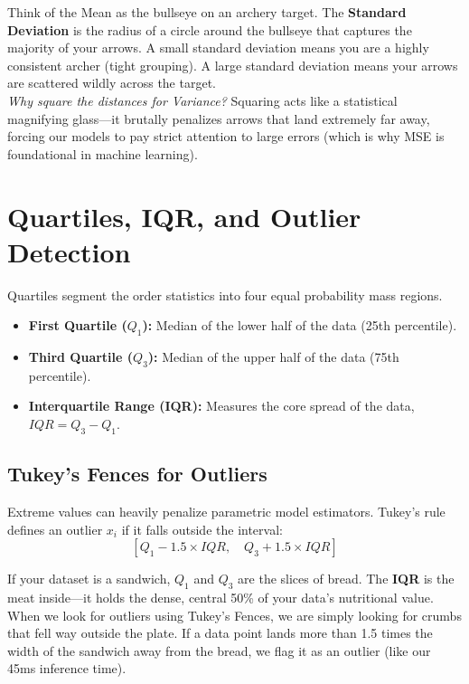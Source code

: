 \documentclass[11pt, a4paper]{article}
\begin{document}
\begin{tcolorbox}[profbox, title=Imagine: The Archer's Target]
Think of the Mean as the bullseye on an archery target. The \textbf{Standard Deviation} is the radius of a circle around the bullseye that captures the majority of your arrows. A small standard deviation means you are a highly consistent archer (tight grouping). A large standard deviation means your arrows are scattered wildly across the target. \\
\textit{Why square the distances for Variance?} Squaring acts like a statistical magnifying glass—it brutally penalizes arrows that land extremely far away, forcing our models to pay strict attention to large errors (which is why MSE is foundational in machine learning).
\end{tcolorbox}

\section{Quartiles, IQR, and Outlier Detection}
Quartiles segment the order statistics into four equal probability mass regions.

\begin{itemize}
    \item \textbf{First Quartile ($Q_1$):} Median of the lower half of the data (25th percentile). 
    \item \textbf{Third Quartile ($Q_3$):} Median of the upper half of the data (75th percentile).
    \item \textbf{Interquartile Range (IQR):} Measures the core spread of the data, $IQR = Q_3 - Q_1$.
\end{itemize}

\subsection*{Tukey's Fences for Outliers}
Extreme values can heavily penalize parametric model estimators. Tukey's rule defines an outlier $x_i$ if it falls outside the interval:
\[ \left[ Q_1 - 1.5 \times IQR, \quad Q_3 + 1.5 \times IQR \right] \]

\begin{tcolorbox}[profbox, title=Imagine: The Statistical Sandwich]
If your dataset is a sandwich, $Q_1$ and $Q_3$ are the slices of bread. The \textbf{IQR} is the meat inside—it holds the dense, central 50\% of your data's nutritional value. When we look for outliers using Tukey's Fences, we are simply looking for crumbs that fell way outside the plate. If a data point lands more than 1.5 times the width of the sandwich away from the bread, we flag it as an outlier (like our 45ms inference time).
\end{tcolorbox}
\end{document}
